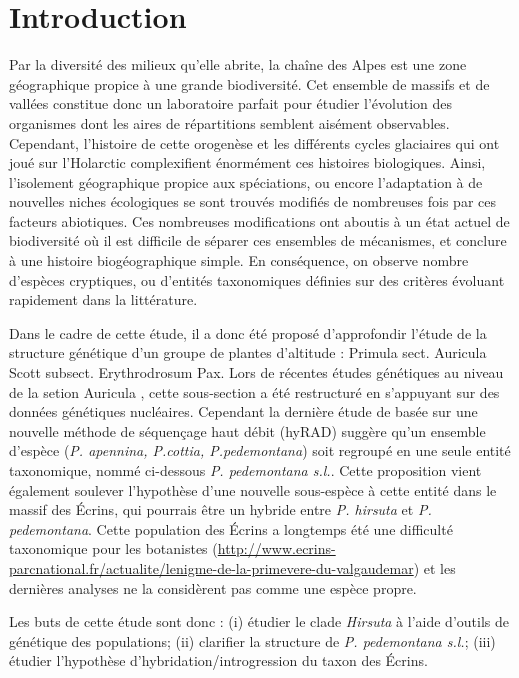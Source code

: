 \section{Introduction}

Par la diversité des milieux qu'elle abrite, la chaîne des Alpes est une zone géographique propice à une grande biodiversité.
Cet ensemble de massifs et de vallées constitue donc un laboratoire parfait pour étudier l'évolution des organismes dont les aires de répartitions semblent aisément observables.
Cependant, l'histoire de cette orogenèse et les différents cycles glaciaires qui ont joué sur l'Holarctic complexifient énormément ces histoires biologiques.
Ainsi, l'isolement géographique propice aux spéciations, ou encore l'adaptation à de nouvelles niches écologiques se sont trouvés modifiés de nombreuses fois par ces facteurs abiotiques.
Ces nombreuses modifications ont aboutis à un état actuel de biodiversité où il est difficile de séparer ces ensembles de mécanismes, et conclure à une histoire biogéographique simple.
En conséquence, on observe nombre d'espèces cryptiques, ou d'entités taxonomiques définies sur des critères évoluant rapidement dans la littérature.

Dans le cadre de cette étude, il a donc été proposé d'approfondir l'étude de la structure génétique d'un groupe de plantes d'altitude : Primula sect. Auricula Scott subsect. Erythrodrosum Pax.%
Lors de récentes études génétiques au niveau de la setion Auricula \citep{Zhang2004,Zhang2004a, Boucher2016a}, cette sous-section a été restructuré en s'appuyant sur des données génétiques nucléaires.
Cependant la dernière étude de \citet{Boucher2016a} basée sur une nouvelle méthode de séquençage haut débit (hyRAD) suggère qu'un ensemble d'espèce (\textit{P. apennina, P.cottia, P.pedemontana}) soit regroupé en une seule entité taxonomique, nommé ci-dessous \textit{P. pedemontana s.l.}.
Cette proposition vient également soulever l'hypothèse d'une nouvelle sous-espèce à cette entité dans le massif des Écrins, qui pourrais être un hybride entre \textit{P. hirsuta} et \textit{P. pedemontana}.
Cette population des Écrins a longtemps été une difficulté taxonomique pour les botanistes (\url{http://www.ecrins-parcnational.fr/actualite/lenigme-de-la-primevere-du-valgaudemar}) et les dernières analyses ne la considèrent pas comme une espèce propre.

Les buts de cette étude sont donc : (i) étudier le clade \textit{Hirsuta} à l'aide d'outils de génétique des populations; (ii) clarifier la structure de \textit{P. pedemontana s.l.}; (iii) étudier l'hypothèse d'hybridation/introgression du taxon des Écrins.

